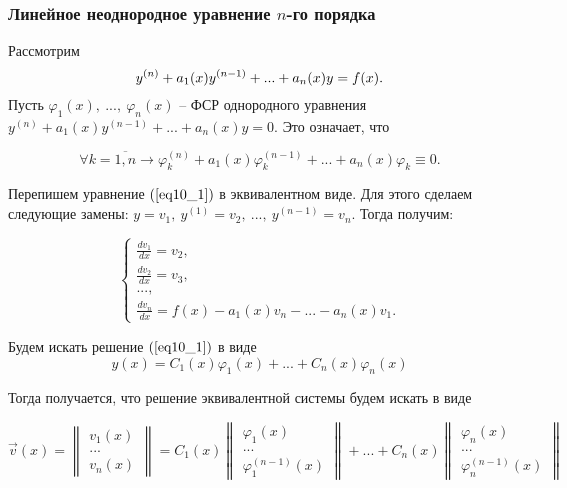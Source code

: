\subsubsection{Линейное неоднородное уравнение $n$-го порядка}

Рассмотрим
\begin{equation}\label{eq10_1}
  y^{(n)} + a_1(x)y^{(n-1)} + ... + a_n(x)y = f(x).\\
\end{equation}
Пусть $\varphi_1(x),~...,~\varphi_n(x)$ -- ФСР однородного уравнения $y^{(n)} + a_1(x)y^{(n-1)} + ... + a_n(x)y = 0$. Это означает, что 

\begin{equation}\label{eq10_2}
\forall k = \overline{1, n} \rightarrow \varphi_k^{(n)} + a_1(x)\varphi_k^{(n-1)} + ... + a_n(x)\varphi_k \equiv 0.
\end{equation}

Перепишем уравнение $(\ref{eq10_1})$ в эквивалентном виде. Для этого сделаем следующие замены: $y = v_1, ~y^{(1)} = v_2,~..., ~y^{(n-1)} = v_n$. Тогда получим:

\begin{equation}\label{eq10_3}
 \begin{cases}
   \frac{dv_1}{dx} = v_2, 
   \\
   \frac{dv_2}{dx} = v_3,
   \\
   ...,
   \\
   \frac{dv_n}{dx} = f(x) - a_1(x)v_n - ... - a_n(x)v_1.
 \end{cases}
\end{equation}

Будем искать решение $(\ref{eq10_1})$ в виде
\[y(x) = C_1(x)\varphi_1(x) + ... + C_n(x)\varphi_n(x)\]

Тогда получается, что решение эквивалентной системы будем искать в виде

\begin{equation}
\overrightarrow{v}(x) = 
  \begin{Vmatrix}
      v_1(x)\\
      ...\\
      v_n(x)
  \end{Vmatrix} = C_1(x)
    \begin{Vmatrix}
        \varphi_1(x)\\
        ...\\
        \varphi_1^{(n-1)}(x)
    \end{Vmatrix} + ... + C_n(x)
      \begin{Vmatrix}
          \varphi_n(x)\\
          ...\\
          \varphi_n^{(n-1)}(x)
      \end{Vmatrix}
\end{equation}

